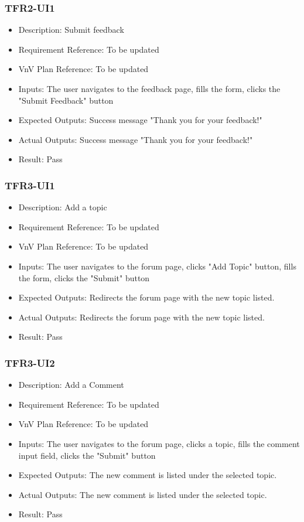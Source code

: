 \documentclass[12pt, titlepage]{article}
\begin{document}
\subsubsection{TFR2-UI1}\label{3.2.2}
\begin{itemize}
    \item Description: Submit feedback
    \item Requirement Reference: To be updated
    \item VnV Plan Reference: To be updated
    \item Inputs: The user navigates to the feedback page, fills the form, clicks the "Submit Feedback" button
    \item Expected Outputs: Success message "Thank you for your feedback!"
    \item Actual Outputs: Success message "Thank you for your feedback!"
    \item Result: Pass
\end{itemize}

\subsubsection{TFR3-UI1}\label{3.2.3}
\begin{itemize}
    \item Description: Add a topic
    \item Requirement Reference: To be updated
    \item VnV Plan Reference: To be updated
    \item Inputs: The user navigates to the forum page, clicks "Add Topic" button, fills the form, clicks the "Submit" button
    \item Expected Outputs: Redirects the forum page with the new topic listed.
    \item Actual Outputs: Redirects the forum page with the new topic listed.
    \item Result: Pass
\end{itemize}

\subsubsection{TFR3-UI2}\label{3.2.4}
\begin{itemize}
    \item Description: Add a Comment
    \item Requirement Reference: To be updated
    \item VnV Plan Reference: To be updated
    \item Inputs: The user navigates to the forum page, clicks a topic, fills the comment input field, clicks the "Submit" button
    \item Expected Outputs: The new comment is listed under the selected topic.
    \item Actual Outputs: The new comment is listed under the selected topic.
    \item Result: Pass
\end{itemize}
\end{document}

